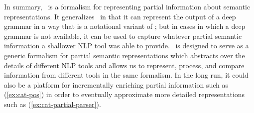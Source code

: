 In summary, \rmrs\ is a formalism for representing partial information
about semantic representations.  It generalizes \mrs\ in that it can
represent the output of a deep grammar in a way that is a notational
variant of \mrs; but in cases in which a deep grammar is not
available, it can be used to capture whatever partial semantic
information a shallower NLP tool was able to provide.  \rmrs\ is
designed to serve as a generic formalism for partial semantic
representations which abstracts over the details of different NLP
tools and allows us to represent, process, and compare information
from different tools in the same formalism.  In the long run, it could
also be a platform for incrementally enriching partial information
such as (\ref{ex:cat-pos}) in order to eventually approximate more
detailed representations such as (\ref{ex:cat-partial-parser}).


